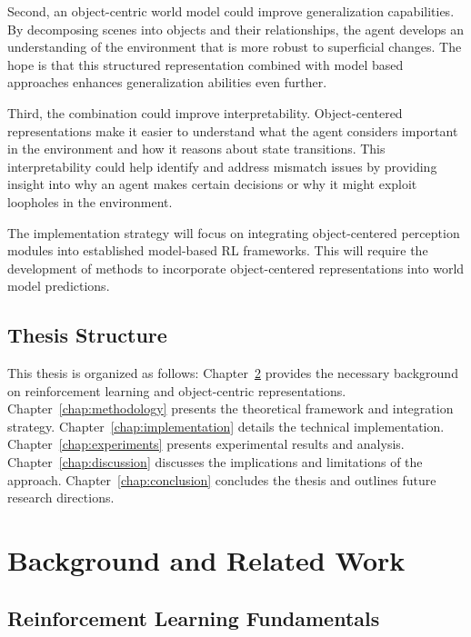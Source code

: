 \documentclass[
	english,
	ruledheaders=section,
	class=report,
	thesis={type=master},
	accentcolor=9c,
	custommargins=true,
	marginpar=false,
	parskip=half-,
	fontsize=11pt,
]{tudapub}
\begin{document}
Second, an object-centric world model could improve generalization capabilities. By decomposing scenes into objects and their relationships, the agent develops an understanding of the environment that is more robust to superficial changes. The hope is that this structured representation combined with model based approaches enhances generalization abilities even further.

Third, the combination could improve interpretability. Object-centered representations make it easier to understand what the agent considers important in the environment and how it reasons about state transitions. This interpretability could help identify and address mismatch issues by providing insight into why an agent makes certain decisions or why it might exploit loopholes in the environment.

The implementation strategy will focus on integrating object-centered perception modules into established model-based RL frameworks. This will require the development of methods to incorporate object-centered representations into world model predictions.

\section{Thesis Structure}
\label{sec:structure}

This thesis is organized as follows: Chapter~\ref{chap:background} provides the necessary background on reinforcement learning and object-centric representations. Chapter~\ref{chap:methodology} presents the theoretical framework and integration strategy. Chapter~\ref{chap:implementation} details the technical implementation. Chapter~\ref{chap:experiments} presents experimental results and analysis. Chapter~\ref{chap:discussion} discusses the implications and limitations of the approach. Chapter~\ref{chap:conclusion} concludes the thesis and outlines future research directions.

\chapter{Background and Related Work}
\label{chap:background}

\section{Reinforcement Learning Fundamentals}
\label{sec:rl_fundamentals}
\end{document}
